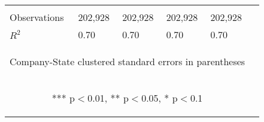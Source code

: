 \documentclass[12pt]{article}
\begin{document}
\begin{center}
\begin{longtable}{p{}p{}p{}p{}p{}p{}}
\vspace{2pt} & \begin{footnotesize}\end{footnotesize} & \begin{footnotesize}\end{footnotesize} & \begin{footnotesize}\end{footnotesize} & \begin{footnotesize}\end{footnotesize} \\
Observations & 202,928 & 202,928 & 202,928 & 202,928 \\
 $R^2$ & 0.70 & 0.70 & 0.70 & 0.70 \\ \hline
\multicolumn{5}{c}{\begin{footnotesize} Company-State clustered standard errors in parentheses\end{footnotesize}} \\
\multicolumn{5}{c}{\begin{footnotesize} *** p$<$0.01, ** p$<$0.05, * p$<$0.1\end{footnotesize}} \\
\end{longtable}
\end{center}


 

\end{document}

